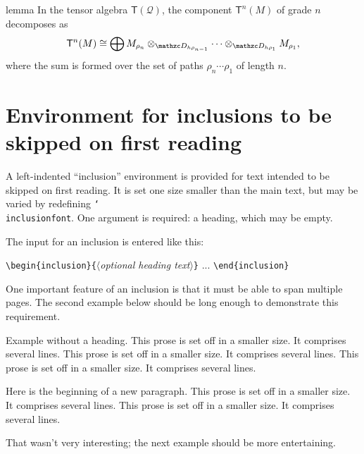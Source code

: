 \documentclass[multixcb]{amstext-l}
\theoremstyle{plain}
\theoremstyle{definition}
\newcommand{\cs}[1]{\texttt{\char`\\#1}}
\def\<#1>{$\langle$\textit{#1}$\rangle$}
\newenvironment{exm}{%
  \par
  \begingroup
    \parindent0pt
    \leftskip2\normalparindent
    \obeylines
}{%
    \par
  \endgroup
}
\begin{document}
\begin{framedthm}{lemma}
In the tensor algebra $\mathsf T(\mathscr Q)$, the
component $\mathsf T^n(M)$ of grade $n$ decomposes as
$$\mathsf T^n(M)\cong\bigoplus M_{\rho_n}
 \otimes_{\mathzc D_{h\rho_{n-1}}}\cdots\otimes_{\mathzc  D_{h\rho_1}}M_{\rho_1},
$$
where the sum is formed over the set of paths $\rho_n\cdots\rho_1$
of length $n$.
\end{framedthm}

\section{Environment for inclusions to be skipped on first reading}

A left-indented ``inclusion'' environment is provided for text
intended to be skipped on first reading.  It is set one size smaller
than the main text, but may be varied by redefining \cs{inclusionfont}.
One argument is required: a heading, which may be empty.

The input for an inclusion is entered like this:
\begin{exm}
\verb+\begin{inclusion}{+\<optional heading text>\verb+}+
...
\verb+\end{inclusion}+
\end{exm}

One important feature of an inclusion is that it must be able to
span multiple pages.  The second example below should be long
enough to demonstrate this requirement.

\begin{inclusion}{}
Example without a heading.
This prose is set off in a smaller size.  It comprises several lines.
This prose is set off in a smaller size.  It comprises several lines.
This prose is set off in a smaller size.  It comprises several lines.

Here is the beginning of a new paragraph.
This prose is set off in a smaller size.  It comprises several lines.
This prose is set off in a smaller size.  It comprises several lines.
\end{inclusion}

That wasn't very interesting; the next example should be more entertaining.
\end{document}
